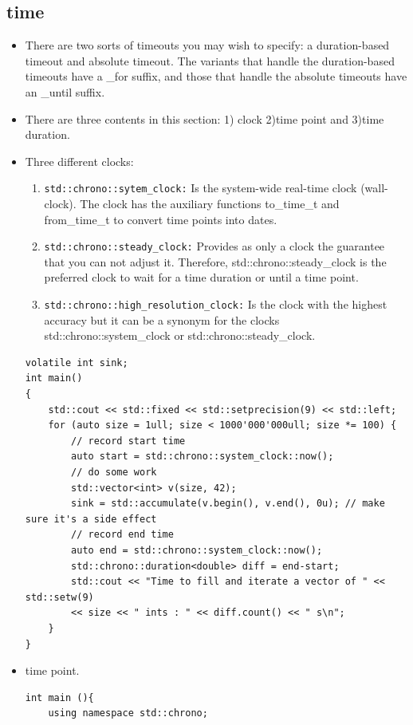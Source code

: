 \documentclass[a4paper,11pt,twoside]{book}
\begin{document}
\subsection{time}
\begin{itemize}
	\item There are two sorts of timeouts you may wish to specify: a duration-based timeout and absolute timeout. The variants that handle the duration-based timeouts have a \_for suffix, and those that handle the absolute timeouts have an \_until suffix.
	
	\item There are three contents in this section: 1) clock 2)time point and 3)time duration.

	\item Three different clocks:
	\begin{enumerate}
		\item \texttt{std::chrono::sytem\_clock:} Is the system-wide real-time clock (wall-clock). The clock has the auxiliary functions to\_time\_t and from\_time\_t to convert time points into dates.
		
		\item \texttt{std::chrono::steady\_clock:}  Provides as only a clock the guarantee that you can not adjust it. Therefore, std::chrono::steady\_clock is the preferred clock to wait for a time duration or until a time point.
		
		\item \texttt{std::chrono::high\_resolution\_clock:} Is the clock with the highest accuracy but it can be a synonym for the clocks std::chrono::system\_clock or std::chrono::steady\_clock.
	\end{enumerate}

\begin{lstlisting}[numbers=none]
volatile int sink;
int main()
{
	std::cout << std::fixed << std::setprecision(9) << std::left;
	for (auto size = 1ull; size < 1000'000'000ull; size *= 100) {
		// record start time
		auto start = std::chrono::system_clock::now();
		// do some work
		std::vector<int> v(size, 42);
		sink = std::accumulate(v.begin(), v.end(), 0u); // make sure it's a side effect
		// record end time
		auto end = std::chrono::system_clock::now();
		std::chrono::duration<double> diff = end-start;
		std::cout << "Time to fill and iterate a vector of " << std::setw(9)
		<< size << " ints : " << diff.count() << " s\n";
	}
}
\end{lstlisting}

	\item time point.
\begin{lstlisting}[numbers=none]
int main (){
	using namespace std::chrono;
	

\end{lstlisting}
\end{itemize}
\end{document}
